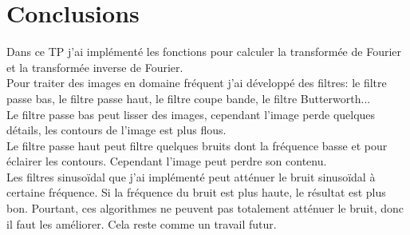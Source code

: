 \documentclass[paper=a4, fontsize=11pt]{scrartcl}	%
\begin{document}
\section{Conclusions}
Dans ce TP j’ai implémenté les fonctions pour calculer la transformée de Fourier et la transformée inverse de Fourier.\\
Pour traiter des images en domaine fréquent j'ai développé des filtres: le filtre passe bas, le filtre passe haut, le filtre coupe bande, le filtre Butterworth... \\ 
Le filtre passe bas peut lisser des images, cependant l'image perde quelques détails, les contours de l'image est plus flous.\\
Le filtre passe haut peut filtre quelques bruits dont la fréquence basse et pour éclairer les contours. Cependant l'image peut perdre son contenu.\\
Les filtres sinusoïdal que j'ai implémenté peut atténuer le bruit sinusoïdal à certaine fréquence. Si la fréquence du bruit est plus haute, le résultat est plus bon. Pourtant, ces algorithmes ne peuvent pas totalement atténuer le bruit, donc il faut les améliorer. Cela reste comme un travail futur. 
\end{document}
